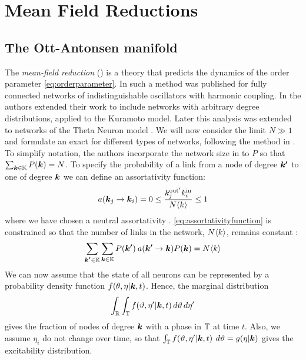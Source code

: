 \newpage
\section{Mean Field Reductions} \label{sec:MFRs}
\subsection{The Ott-Antonsen manifold}
The \textsl{mean-field reduction} (\MFR) is a theory that predicts the dynamics of the order parameter \eqref{eq:orderparameter}. In \cite{OttAntonsen2008, OttAntonsen2009, OttAntonsen2010} such a method was published for fully connected networks of indistinguishable oscillators with harmonic coupling. In \cite{Restrepo2014} the authors extended their work to include networks with arbitrary degree distributions, applied to the Kuramoto model. Later this analysis was extended to networks of the Theta Neuron model \cite{OttAntonsen2017}. We will now consider the limit $N \gg 1$ and formulate an exact \MFR for different types of networks, following the method in \cite{OttAntonsen2017}. \\

To simplify notation, the authors incorporate the network size in to $P$ so that $\sum_{{\boldsymbol{k}} \in {\mathbb{K}}} P({\boldsymbol{k}}) = N$. To specify the probability of a link from a node of degree ${\boldsymbol{k'}}$ to one of degree ${\boldsymbol{k}}$ we can define an assortativity function:
\begin{align}
a\left(\k_j \rightarrow \k_i \right) = 0 \leq \frac{k^{\rm{out}^{\prime}}_j k^{\rm{in}}_i}{N \kmean} \leq 1 \label{eq:assortativityfunction}
\end{align}
where we have chosen a neutral assortativity \cite{OttAntonsen2017}. \eqref{eq:assortativityfunction} is constrained so that the number of links in the network, $N {\langle k\rangle}$, remains constant \cite{Restrepo2014}:
\begin{align*}
\sum_{\kacc \in \K} \sum_{\k \in \K} P\left( \kacc \right) \: a\left(\kacc \rightarrow \k\right) P\left(\k\right) = N \kmean
\end{align*}
We can now assume that the state of all neurons can be represented by a probability density function $f(\theta, \eta | {\boldsymbol{k}}, t)$. Hence, the marginal distribution 
\begin{align*}
    \int_{{\mathbb{R}}} \int_{{\mathbb{T}}} f(\vartheta, \eta^{\prime} | {\boldsymbol{k}}, t) \mathop{d \vartheta} \mathop{d \eta^{\prime}} 
\end{align*}
gives the fraction of nodes of degree ${\boldsymbol{k}}$ with a phase in ${\mathbb{T}}$ at time $t$. Also, we assume $\eta_i$ do not change over time, so that $\int_{{\mathbb{T}}} f(\vartheta, \eta^{\prime} | {\boldsymbol{k}}, t) \: \mathop{d \vartheta} = g(\eta | {\boldsymbol{k}})$ gives the excitability distribution. \\

